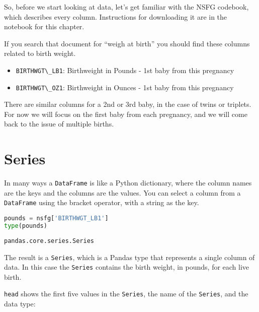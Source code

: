 So, before we start looking at data, let's get familiar with the NSFG
codebook, which describes every column. Instructions for downloading it
are in the notebook for this chapter.

If you search that document for ``weigh at birth'' you should find these
columns related to birth weight.

\begin{itemize}
\item
  \passthrough{\lstinline!BIRTHWGT\_LB1!}: Birthweight in Pounds - 1st
  baby from this pregnancy
\item
  \passthrough{\lstinline!BIRTHWGT\_OZ1!}: Birthweight in Ounces - 1st
  baby from this pregnancy
\end{itemize}

There are similar columns for a 2nd or 3rd baby, in the case of twins or
triplets. For now we will focus on the first baby from each pregnancy,
and we will come back to the issue of multiple births.

\section{Series}\label{series}

In many ways a \passthrough{\lstinline!DataFrame!} is like a Python
dictionary, where the column names are the keys and the columns are the
values. You can select a column from a
\passthrough{\lstinline!DataFrame!} using the bracket operator, with a
string as the key.

\begin{lstlisting}[language=Python,style=source]
pounds = nsfg['BIRTHWGT_LB1']
type(pounds)
\end{lstlisting}

\begin{lstlisting}[style=output]
pandas.core.series.Series
\end{lstlisting}

The result is a \passthrough{\lstinline!Series!}, which is a Pandas type
that represents a single column of data. In this case the
\passthrough{\lstinline!Series!} contains the birth weight, in pounds,
for each live birth.

\passthrough{\lstinline!head!} shows the first five values in the
\passthrough{\lstinline!Series!}, the name of the
\passthrough{\lstinline!Series!}, and the data type:


